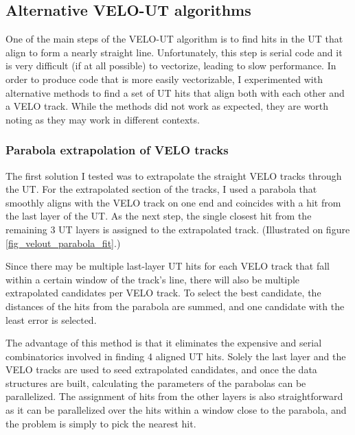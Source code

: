 \documentclass[12pt]{article}
\begin{document}
\subsection{Alternative VELO-UT algorithms}\label{sec_velout_alternative}

One of the main steps of the VELO-UT algorithm is to find hits in the UT that align to form a nearly straight line. Unfortunately, this step is serial code and it is very difficult (if at all possible) to vectorize, leading to slow performance. In order to produce code that is more easily vectorizable, I experimented with alternative methods to find a set of UT hits that align both with each other and a VELO track. While the methods did not work as expected, they are worth noting as they may work in different contexts.

\subsubsection{Parabola extrapolation of VELO tracks}

The first solution I tested was to extrapolate the straight VELO tracks through the UT. For the extrapolated section of the tracks, I used a parabola that smoothly aligns with the VELO track on one end and coincides with a hit from the last layer of the UT. As the next step, the single closest hit from the remaining 3 UT layers is assigned to the extrapolated track. (Illustrated on figure \ref{fig_velout_parabola_fit}.)

Since there may be multiple last-layer UT hits for each VELO track that fall within a certain window of the track's line, there will also be multiple extrapolated candidates per VELO track. To select the best candidate, the distances of the hits from the parabola are summed, and one candidate with the least error is selected.

The advantage of this method is that it eliminates the expensive and serial combinatorics involved in finding 4 aligned UT hits. Solely the last layer and the VELO tracks are used to seed extrapolated candidates, and once the data structures are built, calculating the parameters of the parabolas can be parallelized. The assignment of hits from the other layers is also straightforward as it can be parallelized over the hits within a window close to the parabola, and the problem is simply to pick the nearest hit.
\end{document}
